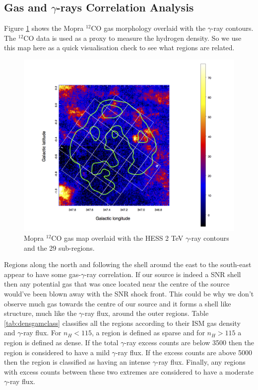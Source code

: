 \documentclass[12pt,a4paper]{article}
\begin{document}
\subsection{Gas and \textbf{$\gamma$}-rays Correlation Analysis}
Figure \ref{fig:sgpsnantenregmaphesscont} shows the Mopra $^{12}$CO gas morphology overlaid with the $\gamma$-ray contours. The $^{12}$CO data is used as a proxy to measure the hydrogen density. So we use this map here as a quick visualisation check to see what regions are related.
\begin{figure}[h]
	\centering
	\includegraphics[width=0.75\linewidth, height=0.35\textheight]{mopra_regmap_hesscont}
	\caption{Mopra $^{12}$CO gas map overlaid with the HESS 2 TeV $\gamma$-ray contours and the 29 sub-regions.}
	\label{fig:sgpsnantenregmaphesscont}
\end{figure}
Regions along the north and following the shell around the east to the south-east appear to have some gas-$\gamma$-ray correlation. If our source is indeed a SNR shell then any potential gas that was once located near the centre of the source would've been blown away with the SNR shock front. This could be why we don't observe much gas towards the centre of our source and it forms a shell like structure, much like the $\gamma$-ray flux, around the outer regions. Table \ref{tab:densgamclass} classifies all the regions according to their ISM gas density and $\gamma$-ray flux. For $n_H < 115$, a region is defined as sparse and for $n_H > 115$ a region is defined as dense. If the total $\gamma$-ray excess counts are below 3500 then the region is considered to have a mild $\gamma$-ray flux. If the excess counts are above 5000 then the region is classified as having an intense $\gamma$-ray flux. Finally, any regions with excess counts between these two extremes are considered to have a moderate $\gamma$-ray flux. 
\end{document}
